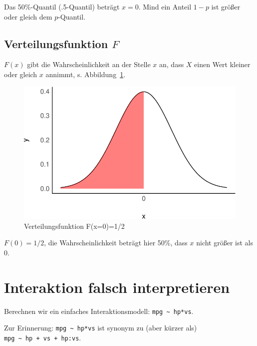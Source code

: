 \documentclass[
  a4paper,
  DIV=11]{scrreprt}
\theoremstyle{definition}
\theoremstyle{remark}
\begin{document}
Das 50\%-Quantil (.5-Quantil) beträgt \(x=0\). Mind ein Anteil \(1-p\)
ist größer oder gleich dem \(p\)-Quantil.

\hypertarget{verteilungsfunktion-f}{%
\subsection{\texorpdfstring{Verteilungsfunktion
\(F\)}{Verteilungsfunktion F}}\label{verteilungsfunktion-f}}

\(F(x)\) gibt die Wahrscheinlichkeit an der Stelle \(x\) an, dass \(X\)
einen Wert kleiner oder gleich \(x\) annimmt, s. Abbildung~\ref{fig-F}.

\begin{figure}

{\centering \includegraphics{./abschluss_files/figure-pdf/fig-F-1.pdf}

}

\caption{\label{fig-F}Verteilungsfunktion F(x=0)=1/2}

\end{figure}

\(F(0)=1/2\), die Wahrscheinlichkeit beträgt hier 50\%, dass \(x\) nicht
größer ist als 0.

\hypertarget{interaktion-falsch-interpretieren}{%
\section{Interaktion falsch interpretieren
🤷}\label{interaktion-falsch-interpretieren}}

Berechnen wir ein einfaches Interaktionsmodell:
\texttt{mpg\ \textasciitilde{}\ hp*vs}.

\begin{tcolorbox}[enhanced jigsaw, leftrule=.75mm, toptitle=1mm, bottomtitle=1mm, titlerule=0mm, breakable, colframe=quarto-callout-note-color-frame, title=\textcolor{quarto-callout-note-color}{\faInfo}\hspace{0.5em}{Hinweis}, rightrule=.15mm, colback=white, arc=.35mm, left=2mm, bottomrule=.15mm, coltitle=black, opacitybacktitle=0.6, toprule=.15mm, colbacktitle=quarto-callout-note-color!10!white, opacityback=0]
Zur Erinnerung: \texttt{mpg\ \textasciitilde{}\ hp*vs} ist synonym zu
(aber kürzer als) \texttt{mpg\ \textasciitilde{}\ hp\ +\ vs\ +\ hp:vs}.
\end{tcolorbox}
\end{document}
